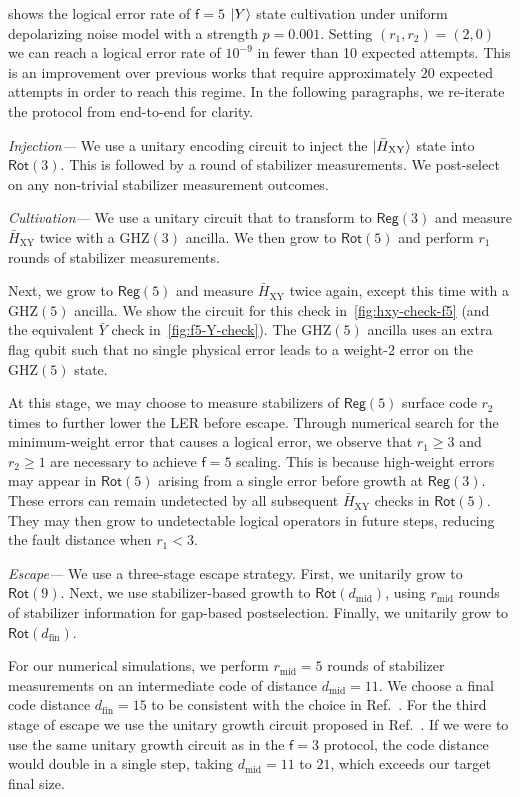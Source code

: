 \documentclass[%
    aps, 
    physrev,
    reprint,
]{revtex4-2}
\newcommand{\fd}[1]{\mathsf{f}=#1}
\newcommand{\rot}[1]{\mathsf{Rot}(#1)}
\newcommand{\reg}[1]{\mathsf{Reg}(#1)}
\newcommand{\XY}{_\mathrm{XY}}
\newcommand{\fin}{_\mathrm{fin}}
\begin{document}
 shows the logical error rate of $\fd5$ $\ket{Y}$ state cultivation under uniform depolarizing noise model with a strength $p = 0.001$.
Setting $(r_1, r_2) = (2,0)$ we can reach a logical error rate of $10^{-9}$ in fewer than 10 expected attempts.
This is an improvement over previous works that require approximately $20$ expected attempts in order to reach this regime.
In the following paragraphs, we re-iterate the protocol from end-to-end for clarity. 

\textit{Injection---}  
We use a unitary encoding circuit to inject the $\ket{\bar{H}\XY}$ state into $\rot3$. 
This is followed by a round of stabilizer measurements.
We post-select on any non-trivial stabilizer measurement outcomes.

\textit{Cultivation---} 
We use a unitary circuit that to transform to $\reg3$ and measure $\bar{H}\XY$ twice with a $\mathrm{GHZ}(3)$ ancilla. 
We then grow to $\rot5$ and perform $r_1$ rounds of stabilizer measurements.


Next, we grow to $\reg{5}$ and measure $\bar{H}\XY$ twice again, except this time with a $\mathrm{GHZ}(5)$ ancilla.
We show the circuit for this check in~\cref{fig:hxy-check-f5} (and the equivalent $\bar{Y}$ check in~\cref{fig:f5-Y-check}). 
The $\mathrm{GHZ}(5)$ ancilla uses
an extra flag qubit such that no single physical error leads to a weight-2 error on the $\mathrm{GHZ}(5)$ state. 

At this stage, we may choose to measure stabilizers of $\reg{5}$ surface code $r_2$ times to further lower the LER before escape. 
Through numerical search for the minimum-weight error that causes a logical error, we observe that $r_1 \geq 3$ and $r_2\ge1$ are necessary to achieve $\fd5$ scaling. 
This is because high-weight errors may appear in $\rot5$ arising from a single error before growth at $\reg3$. 
These errors can remain undetected by all subsequent $\bar{H}\XY$ checks in $\rot5$. 
They may then grow to undetectable logical operators in future steps, reducing the fault distance when $r_1 < 3$.

\textit{Escape---} 
We use a three-stage escape strategy.
First, we unitarily grow to $\rot 9$.
Next, we use stabilizer-based growth to $\rot{d_\mathrm{mid}}$, using $r_\mathrm{mid}$ rounds of stabilizer information for gap-based postselection.
Finally, we unitarily grow to $\rot{d\fin}$.

For our numerical simulations, we perform $r_\mathrm{mid}=5$ rounds of stabilizer measurements on an intermediate code of distance $d_\mathrm{mid} = 11$.
We choose a final code distance $d\fin=15$ to be consistent with the choice in Ref.~\cite{gidney2024magic}. 
For the third stage of escape we use the unitary growth circuit proposed in Ref.~\cite{claes2025lowerdepthlocalencodingcircuits}.
If we were to use the same unitary growth circuit as in the $\fd3$ protocol, the code distance would double in a single step, taking $d_\mathrm{mid} = 11$ to $21$, which exceeds our target final size. 
\end{document}
